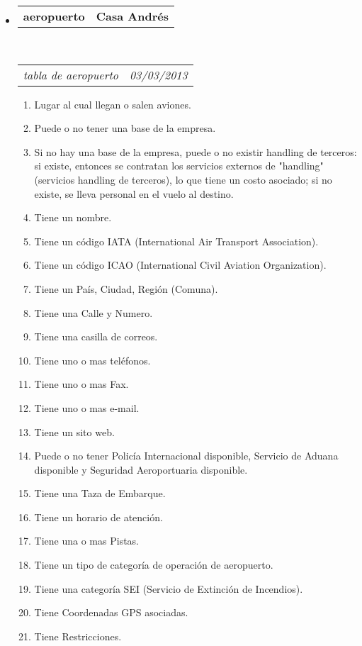 \documentclass[10pt,letterpaper]{article}
\makeatletter
\newcommand{\headerrow}[2]
{\begin{tabular*}{\linewidth}{l@{\extracolsep{\fill}}r}
	#1 &
	#2 \\
\end{tabular*}}
\makeatother
\begin{document}
\begin{itemize}
	\parskip=0.1em

	\item
	\headerrow
		{\textbf{aeropuerto}}
		{\textbf{Casa Andrés}}
	\\
	\headerrow
		{\emph{tabla de aeropuerto}}
		{\emph{03/03/2013}}
	\begin{enumerate}
		\item Lugar al cual llegan o salen aviones.
		\item Puede o no tener una base de la empresa.
		\item Si no hay una base de la empresa, puede o no existir handling de terceros: si existe, entonces se contratan los servicios externos de "handling" (servicios handling de terceros), lo que tiene un costo asociado; si no existe, se lleva personal en el vuelo al destino.
		\item Tiene un nombre.
		\item Tiene un código IATA (International Air Transport Association).
		\item Tiene un código ICAO (International Civil Aviation Organization).
		\item Tiene un País, Ciudad, Región (Comuna).
		\item Tiene una Calle y Numero.
		\item Tiene una casilla de correos.
		\item Tiene uno o mas teléfonos.
		\item Tiene uno o mas Fax.
		\item Tiene uno o mas e-mail.
		\item Tiene un sito web.
		\item Puede o no tener Policía Internacional disponible, Servicio de Aduana disponible y Seguridad Aeroportuaria disponible.
		\item Tiene una Taza de Embarque.
		\item Tiene un horario de atención.
		\item Tiene una o mas Pistas.
		\item Tiene un tipo de categoría de operación de aeropuerto.
		\item Tiene una categoría SEI (Servicio de Extinción de Incendios).
		\item Tiene Coordenadas GPS asociadas.
		\item Tiene Restricciones.
	\end{enumerate}

\end{itemize}
\end{document}
